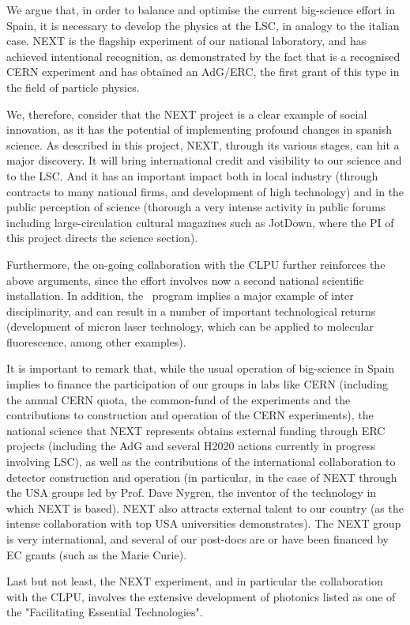 We argue that, in order to balance and optimise the current big-science effort in Spain, it is necessary to develop the physics at the LSC, in analogy to the italian case. NEXT is the flagship experiment of our national laboratory, and has achieved intentional recognition, as demonstrated by the fact that is a recognised CERN experiment and has obtained an AdG/ERC, the first grant of this type in the field of particle physics. 

We, therefore, consider that the NEXT project is a clear example of social innovation, as it has the potential of implementing profound changes in spanish science. As described in this project, NEXT, through its various stages, can hit a major discovery. It will bring international credit and visibility to our science and to the LSC. And it has an important impact both in local industry (through contracts to many national firms, and development of high technology) and in the public perception of science (thorough a very intense activity in public forums including large-circulation cultural magazines such as JotDown, where the PI of this project directs the science section). 

Furthermore, the on-going collaboration with the CLPU further reinforces the above arguments, since the effort involves now a second national scientific installation. In addition, the \BATA\ program implies a major example of inter disciplinarity, and can result in a number of important technological returns (development of micron laser technology, which can be applied to molecular fluorescence, among other examples).

It is important to remark that, while the usual operation of big-science in Spain implies to finance the participation of our groups in labs like CERN (including the annual CERN quota, the common-fund of the experiments and the contributions to construction and operation of the CERN experiments), the national science that NEXT represents obtains external funding through ERC projects (including the AdG and several H2020 actions currently in progress involving LSC), as well as the contributions of the international collaboration to detector construction and operation (in particular, in the case of NEXT through the USA groups led by Prof. Dave Nygren, the inventor of the technology in which NEXT is based). NEXT also attracts external talent to our country (as the intense collaboration with top USA universities demonstrates). The NEXT group is very international, and several of our post-docs are or have been financed by EC grants (such as the Marie Curie). 

Last but not least, the NEXT experiment, and in particular the collaboration with the CLPU, involves the extensive development of photonics listed as one of the  "Facilitating Essential Technologies".